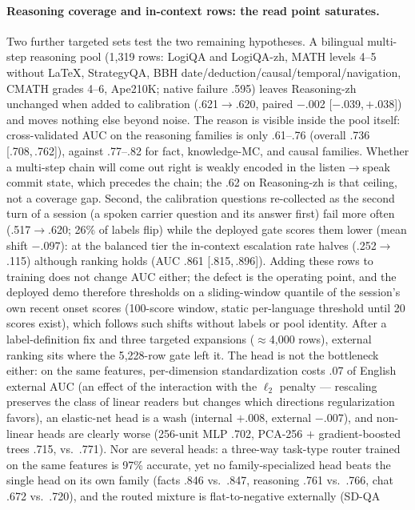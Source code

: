 \paragraph{Reasoning coverage and in-context rows: the read point
saturates.} Two further targeted sets test the two remaining
hypotheses. A bilingual multi-step reasoning pool (1{,}319 rows:
LogiQA and LogiQA-zh, MATH levels 4--5 without LaTeX, StrategyQA,
BBH date/deduction/causal/temporal/navigation, CMATH grades 4--6,
Ape210K; native failure .595) leaves Reasoning-zh unchanged when
added to calibration (.621$\to$.620, paired $-$.002
[$-$.039,\,$+$.038]) and moves nothing else beyond noise. The reason
is visible inside the pool itself: cross-validated AUC on the
reasoning families is only .61--.76 (overall .736 [.708,\,.762]),
against .77--.82 for fact, knowledge-MC, and causal families. Whether
a multi-step chain will come out right is weakly encoded in the
listen$\to$speak commit state, which precedes the chain; the .62 on
Reasoning-zh is that ceiling, not a coverage gap. Second, the
calibration questions re-collected as the second turn of a
session (a spoken carrier question and its answer first) fail more
often (.517$\to$.620; 26\% of labels flip) while the deployed gate
scores them lower (mean shift $-$.097): at the balanced tier
the in-context escalation rate halves (.252$\to$.115) although ranking
holds (AUC .861 [.815,\,.896]). Adding these rows to training does
not change AUC either; the defect is the operating point, and the
deployed demo therefore thresholds on a sliding-window quantile of
the session's own recent onset scores (100-score window, static
per-language threshold until 20 scores exist), which follows such
shifts without labels or pool identity. After a label-definition fix
and three targeted expansions ($\approx$4{,}000 rows), external
ranking sits where the 5{,}228-row gate left it. The head is not the
bottleneck either: on the same features, per-dimension
standardization costs .07 of English external AUC (an effect of the
interaction with the $\ell_2$ penalty --- rescaling preserves the
class of linear readers but changes which directions regularization
favors), an elastic-net head is a wash
(internal $+$.008, external $-$.007), and non-linear heads are
clearly worse (256-unit MLP .702, PCA-256 $+$ gradient-boosted trees
.715, vs.\ .771). Nor are several heads: a three-way task-type
router trained on the same features is 97\% accurate, yet no
family-specialized head beats the single head on its own family
(facts .846 vs.\ .847, reasoning .761 vs.\ .766, chat .672 vs.\
.720), and the routed mixture is flat-to-negative externally (SD-QA
